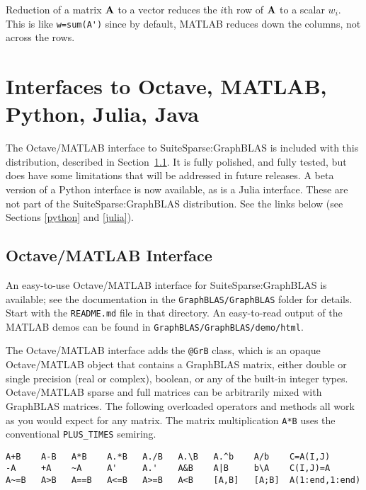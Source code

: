 \documentclass[12pt]{article}
\begin{document}
Reduction of a matrix ${\bf A}$ to a vector reduces the $i$th row of ${\bf A}$
to a scalar $w_i$.  This is like \verb"w=sum(A')" since by default, MATLAB
reduces down the columns, not across the rows.

\newpage
\section{Interfaces to Octave, MATLAB, Python, Julia, Java} %

The Octave/MATLAB interface to SuiteSparse:GraphBLAS is included with this
distribution, described in Section~\ref{octave}.
It is fully polished, and fully tested, but does have
some limitations that will be addressed in future releases.
A beta version of a Python interface is now available, as is a
Julia interface.  These are not part of the SuiteSparse:GraphBLAS distribution.
See the links below (see Sections \ref{python} and \ref{julia}).

\subsection{Octave/MATLAB Interface}
\label{octave}

An easy-to-use Octave/MATLAB interface for SuiteSparse:GraphBLAS is available;
see the documentation in the \verb'GraphBLAS/GraphBLAS' folder for details.
Start with the \verb'README.md' file in that directory.  An easy-to-read output
of the MATLAB demos can be found in \verb'GraphBLAS/GraphBLAS/demo/html'.

The Octave/MATLAB interface adds the \verb'@GrB' class, which is an opaque
Octave/MATLAB object that contains a GraphBLAS matrix, either double or single
precision (real or complex), boolean, or any of the built-in integer types.
Octave/MATLAB sparse and full matrices can be arbitrarily mixed with GraphBLAS
matrices.  The following overloaded operators and methods all work as you would
expect for any matrix.  The matrix multiplication \verb'A*B' uses the
conventional \verb'PLUS_TIMES' semiring.

{\footnotesize
\begin{verbatim}
A+B    A-B   A*B    A.*B   A./B   A.\B   A.^b    A/b    C=A(I,J)
-A     +A    ~A     A'     A.'    A&B    A|B     b\A    C(I,J)=A
A~=B   A>B   A==B   A<=B   A>=B   A<B    [A,B]   [A;B]  A(1:end,1:end) \end{verbatim}}
\end{document}
